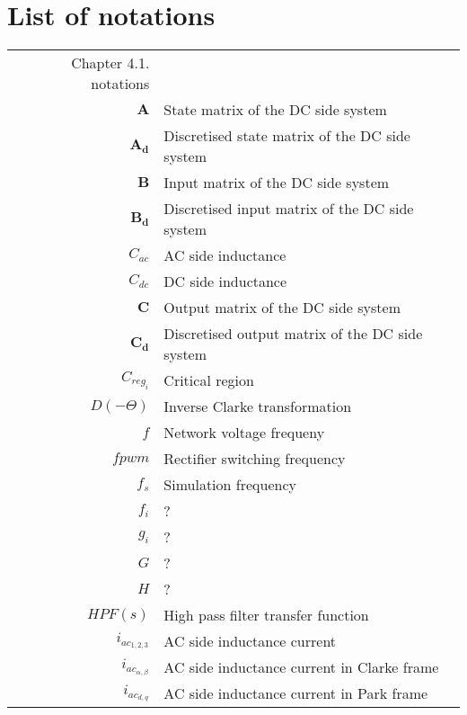 \chapter*{List of notations}

\begin{longtable}{r l}
  Chapter 4.1. notations&\\
  $\boldsymbol{A}$                  & State matrix of the DC side system\\
  $\boldsymbol{A_d}$                & Discretised state matrix of the DC side system\\
  $\boldsymbol{B}$                  & Input matrix of the DC side system\\
  $\boldsymbol{B_d}$                & Discretised input matrix of the DC side system\\
  $C_{ac}$                          & AC side inductance\\
  $C_{dc}$                          & DC side inductance\\
  $\boldsymbol{C}$                  & Output matrix of the DC side system\\
  $\boldsymbol{C_d}$                & Discretised output matrix of the DC side system\\
  $C_{reg_i}$                       & Critical region\\
  $D(-\Theta)$                      & Inverse Clarke transformation\\
  $f$                               & Network voltage frequeny\\
  $fpwm$                            & Rectifier switching frequency\\
  $f_s$                             & Simulation frequency\\
  $f_i$                             & ?\\
  $g_i$                             & ?\\
  $G$                               & ?\\
  $H$                               & ?\\
  $HPF(s)$                          & High pass filter transfer function\\
  $i_{ac_{1,2,3}}$                  & AC side inductance current\\
  $i_{ac_{\alpha,\beta}}$           & AC side inductance current in Clarke frame\\
  $i_{ac_{d,q}}$                    & AC side inductance current in Park frame\\

\end{longtable}
